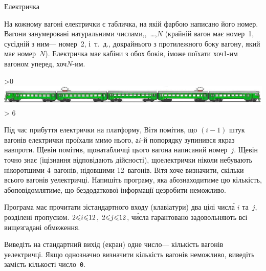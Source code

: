 \begin{problemAllDefault}{Електричка}

На кожному вагоні електрички є табличка, на якій фарбою написано його номер. Вагони занумеровані натуральними числами,,~\dots,\nolinebreak[2] $N$ (крайній вагон має номер~1, сусідній з ним\nolinebreak[3] --- номер~2, і~т.~д., до\nolinebreak[3] крайнього з протилежного боку вагону, який має номер~$N$). Електричка має кабіни з обох боків, і\nolinebreak[3] може поїхати хоч\nolinebreak[2] \mbox{1-им} вагоном уперед, хоч\nolinebreak[3] \mbox{$N$-им}.

\ifnum\pdfoutput>0
\includegraphics[width=\textwidth,keepaspectratio=true]{elTrain.png}
\else
{}
\ifnum\number\month > 6 \ERROR {}\fi
\fi

Під час прибуття електрички на платформу, Вітя помітив, що ${(i{-}1)}$ штук вагонів електрички проїхали мимо нього, а\nolinebreak[2] \mbox{$i$-й} по\nolinebreak[2] порядку зупинився якраз навпроти. Ще\nolinebreak[2] він помітив, що\nolinebreak[2] на\nolinebreak[2] табличці цього вагона написаний номер~$j$. Ще\nolinebreak[2] він точно знає (і\nolinebreak[2] ці\nolinebreak[2] знання відповідають дійсності), що\nolinebreak[2] електрички ніколи не\nolinebreak[3] бувають ні\nolinebreak[3] коротшими 4~вагонів, ні\nolinebreak[3] довшими 12~вагонів. Вітя хоче визначити, скільки всього вагонів у\nolinebreak[2] електричці. Напишіть програму, яка або\nolinebreak[2] знаходитиме цю кількість, або\nolinebreak[2] повідомлятиме, що без\nolinebreak[1] додаткової інформації це\nolinebreak[1] зробити неможливо.

\InputFile
Програма має прочитати зі\nolinebreak[3] стандартного входу (клавіатури) два цілі числ\'{а} $i$ та~$j$, розділені пропуском. ${2{\leqslant}i{\leqslant}12}$, ${2{\leqslant}j{\leqslant}12}$, ч\'{и}сла гарантовано задовольняють всі вищезгадані обмеження.

\OutputFile
Виведіть на стандартний вихід (екран) одне число\nolinebreak[3] --- кількість вагонів у\nolinebreak[3] електричці. Якщо однозначно визначити кількість вагонів неможливо, виведіть замість кількості число~\texttt{0}.

\Example
\begin{exampleSimple}{3em}{3em}%
%
\end{exampleSimple}

\end{problemAllDefault}
